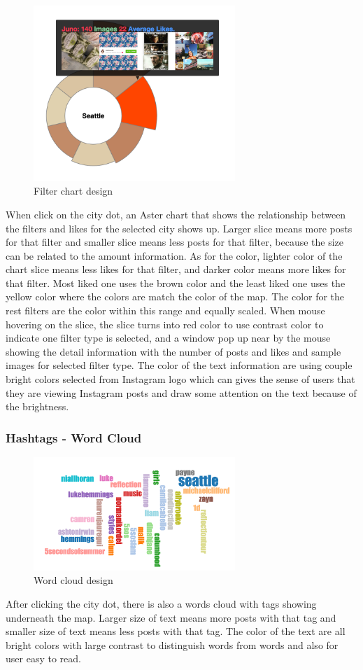 \documentclass[conference]{acmsiggraph}
\begin{document}
\begin{figure}[ht]
  \centering
\includegraphics[width=3in]{images/chart}
  \caption{Filter chart design}
  \label{like-filter}
\end{figure}

When click on the city dot, an Aster chart\cite{aster} that shows the relationship between the filters and likes for the selected city shows up. Larger slice means more posts for that filter and smaller slice means less posts for that filter, because the size can be related to the amount information. As for the color, lighter color of the chart slice means less likes for that filter, and darker color means more likes for that filter. Most liked one uses the brown color and the least liked one uses the yellow color where the colors are match the color of the map. The color for the rest filters are the color within this range and equally scaled. When mouse hovering on the slice, the slice turns into red color to use contrast color to indicate one filter type is selected, and a window pop up near by the mouse showing the detail information with the number of posts and likes and sample images for selected filter type. The color of the text information are using couple bright colors selected from Instagram logo which can gives the sense of users that they are viewing Instagram posts and draw some attention on the text because of the brightness. 

\subsubsection{Hashtags - Word Cloud}
\begin{figure}[ht]
  \centering
\includegraphics[width=3in]{images/word}
  \caption{Word cloud design}
  \label{like-filter}
\end{figure}
After clicking the city dot, there is also a words cloud\cite{word} with tags showing underneath the map. Larger size of text means more posts with that tag and smaller size of text means less posts with that tag. The color of the text are all bright colors with large contrast to distinguish words from words and also for user easy to read.
\end{document}
